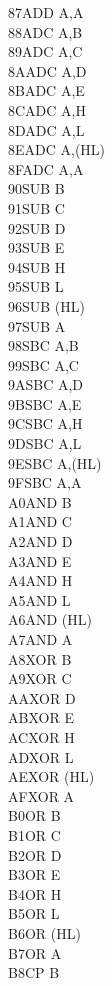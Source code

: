 \documentclass[oneside,a4paper]{book}
\begin{document}
\begin{multicols}{3}
{\begin{tabbing}
87\>ADD A,A\\
88\>ADC A,B\\
89\>ADC A,C\\
8A\>ADC A,D\\
8B\>ADC A,E\\
8C\>ADC A,H\\
8D\>ADC A,L\\
8E\>ADC A,(HL)\\
8F\>ADC A,A\\
90\>SUB B\\
91\>SUB C\\
92\>SUB D\\
93\>SUB E\\
94\>SUB H\\
95\>SUB L\\
96\>SUB (HL)\\
97\>SUB A\\
98\>SBC A,B\\
99\>SBC A,C\\
9A\>SBC A,D\\
9B\>SBC A,E\\
9C\>SBC A,H\\
9D\>SBC A,L\\
9E\>SBC A,(HL)\\
9F\>SBC A,A\\
A0\>AND B\\
A1\>AND C\\
A2\>AND D\\
A3\>AND E\\
A4\>AND H\\
A5\>AND L\\
A6\>AND (HL)\\
A7\>AND A\\
A8\>XOR B\\
A9\>XOR C\\
AA\>XOR D\\
AB\>XOR E\\
AC\>XOR H\\
AD\>XOR L\\
AE\>XOR (HL)\\
AF\>XOR A\\
B0\>OR B\\
B1\>OR C\\
B2\>OR D\\
B3\>OR E\\
B4\>OR H\\
B5\>OR L\\
B6\>OR (HL)\\
B7\>OR A\\
B8\>CP B\\

\end{tabbing}}
\end{multicols}
\end{document}
